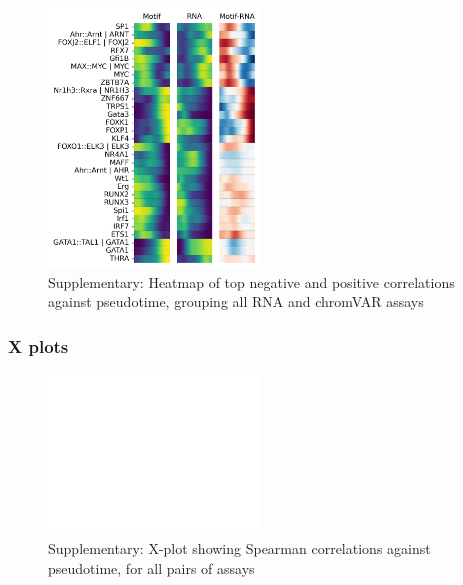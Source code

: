 \documentclass[a4paper]{article}
\begin{document}
\begin{figure}[!htb]
  \centering
  \includegraphics[width=0.5\textwidth]{../figures/hematopoiesis/Erythroid_40_103_single_smooth_none_heatmap_grouped_assays.png}
  \caption{Supplementary: Heatmap of top negative and positive correlations against pseudotime, grouping all RNA and chromVAR assays}
\end{figure}

\FloatBarrier
\subsubsection{X plots}
 
\begin{figure}[!htb]
  \centering
  \includegraphics[width=0.5\textwidth]{../figures/hematopoiesis/Erythroid_40_103_smooth_none_detailed_X_plot.png}
  \caption{Supplementary: X-plot showing Spearman correlations against pseudotime, for all pairs of assays}
\end{figure}
\end{document}
